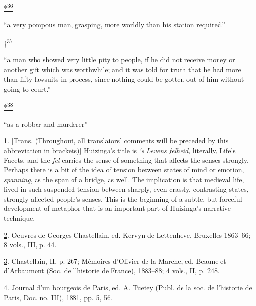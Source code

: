 \protect\hypertarget{23_NOTES.xhtmlux5cux23id_2406}{\protect\hyperlink{08_Chapter_One__THE_PASSIONATE_INTE.xhtmlux5cux23id_2405}{*\textsuperscript{36}}}
``a very pompous man, grasping, more worldly than his station
required.''

\protect\hypertarget{23_NOTES.xhtmlux5cux23id_2408}{\protect\hyperlink{08_Chapter_One__THE_PASSIONATE_INTE.xhtmlux5cux23id_2407}{†\textsuperscript{37}}}
``a man who showed very little pity to people, if he did not receive
money or another gift which was worthwhile; and it was told for truth
that he had more than fifty lawsuits in process, since nothing could be
gotten out of him without going to court.''

\protect\hypertarget{23_NOTES.xhtmlux5cux23id_2410}{\protect\hyperlink{08_Chapter_One__THE_PASSIONATE_INTE.xhtmlux5cux23id_2409}{*\textsuperscript{38}}}
``as a robber and murderer''

\protect\hypertarget{23_NOTES.xhtmlux5cux23id_2228}{\protect\hyperlink{08_Chapter_One__THE_PASSIONATE_INTE.xhtmlux5cux23id_2227}{1}}.
{[}Trans. (Throughout, all translators' comments will be preceded by
this abbreviation in brackets){]} Huizinga's title is \emph{`s Levens
felheid}, literally, Life's Facets, and the \emph{fel} carries the sense
of something that affects the senses strongly. Perhaps there is a bit of
the idea of tension between states of mind or emotion, \emph{spanning},
as the span of a bridge, as well. The implication is that medieval life,
lived in such suspended tension between sharply, even crassly,
contrasting states, strongly affected people's senses. This is the
beginning of a subtle, but forceful development of metaphor that is an
important part of Huizinga's narrative technique.

\protect\hypertarget{23_NOTES.xhtmlux5cux23page_398}{\protect\hyperlink{08_Chapter_One__THE_PASSIONATE_INTE.xhtmlux5cux23id_2226}{2}}.
Oeuvres de Georges Chastellain, ed. Kervyn de Lettenhove, Bruxelles
1863--66; 8 vols., III, p. 44.

\protect\hypertarget{23_NOTES.xhtmlux5cux23id_2225}{\protect\hyperlink{08_Chapter_One__THE_PASSIONATE_INTE.xhtmlux5cux23id_2224}{3}}.
Chastellain, II, p. 267; Mémoires d'Olivier de la Marche, ed. Beaune et
d'Arbaumont (Soc. de l'historie de France), 1883--88; 4 vols., II, p.
248.

\protect\hypertarget{23_NOTES.xhtmlux5cux23id_2223}{\protect\hyperlink{08_Chapter_One__THE_PASSIONATE_INTE.xhtmlux5cux23id_2222}{4}}.
Journal d'un bourgeois de Paris, ed. A. Tuetey (Publ. de la soc. de
l'historie de Paris, Doc. no. III), 1881, pp. 5, 56.

